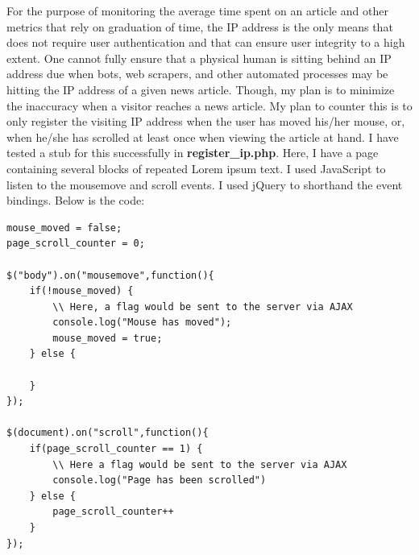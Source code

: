 \documentclass[12pt]{article}
\begin{document}
For the purpose of monitoring the average time spent on an article and other metrics that rely on graduation of time, the IP address is the only means that does not require user authentication and that can ensure user integrity to a high extent. One cannot fully ensure that a physical human is sitting behind an IP address due when bots, web scrapers, and other automated processes may be hitting the IP address of a given news article. Though, my plan is to minimize the inaccuracy when a visitor reaches a news article. My plan to counter this is to only register the visiting IP address when the user has moved his/her mouse, or, when he/she has scrolled at least once when viewing the article at hand. I have tested a stub for this successfully in \textbf{register\_ip.php}. Here, I have a page containing several blocks of repeated Lorem ipsum text. I used JavaScript to listen to the mousemove and scroll events. I used jQuery to shorthand the event bindings. Below is the code:
\begin{lstlisting}
mouse_moved = false;
page_scroll_counter = 0;

$("body").on("mousemove",function(){
	if(!mouse_moved) {
		\\ Here, a flag would be sent to the server via AJAX
		console.log("Mouse has moved");
		mouse_moved = true;
	} else {
		
	}
});

$(document).on("scroll",function(){
	if(page_scroll_counter == 1) {
		\\ Here a flag would be sent to the server via AJAX
		console.log("Page has been scrolled")
	} else {
		page_scroll_counter++
	}
});
\end{lstlisting}        

\vfill
\end{document}

